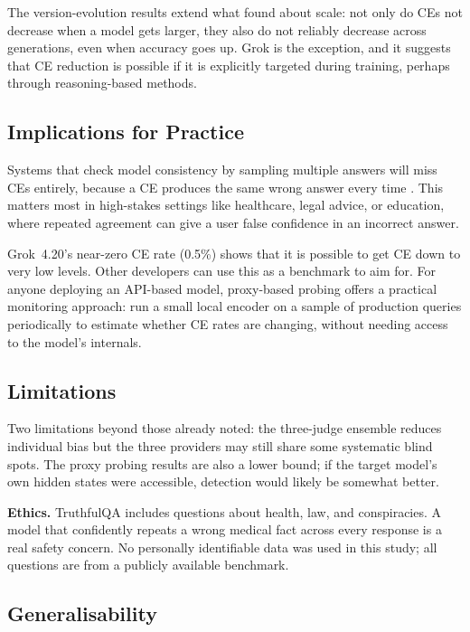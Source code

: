 \documentclass[12pt,twocolumn]{article}
\begin{document}
The version-evolution results extend what \citet{tan2025consistent}
found about scale: not only do CEs not decrease when a model gets
larger, they also do not reliably decrease across generations, even
when accuracy goes up. Grok is the exception, and it suggests
that CE reduction is possible if it is explicitly targeted during
training, perhaps through reasoning-based methods.

\subsection{Implications for Practice}
\label{sec:discussion-practice}

Systems that check model consistency by sampling multiple answers
will miss CEs entirely, because a CE produces the same wrong answer
every time \citep{tan2025consistent, manakul2023selfcheckgpt}. This
matters most in high-stakes settings like healthcare, legal advice,
or education, where repeated agreement can give a user false
confidence in an incorrect answer.

Grok~4.20's near-zero CE rate (0.5\%) shows that it is possible to
get CE down to very low levels. Other developers can use this as a
benchmark to aim for. For anyone deploying an API-based model,
proxy-based probing offers a practical monitoring approach: run a
small local encoder on a sample of production queries periodically
to estimate whether CE rates are changing, without needing access
to the model's internals.

\subsection{Limitations}
\label{sec:discussion-limits}

Two limitations beyond those already noted: the three-judge ensemble
reduces individual bias but the three providers may still share some
systematic blind spots. The proxy probing results are also a
lower bound; if the target model's own hidden states were accessible,
detection would likely be somewhat better.

\textbf{Ethics.} TruthfulQA includes questions about health, law,
and conspiracies. A model that confidently repeats a wrong medical
fact across every response is a real safety concern. No
personally identifiable data was used in this study; all questions
are from a publicly available benchmark.

\subsection{Generalisability}
\label{sec:discussion-general}
\end{document}
